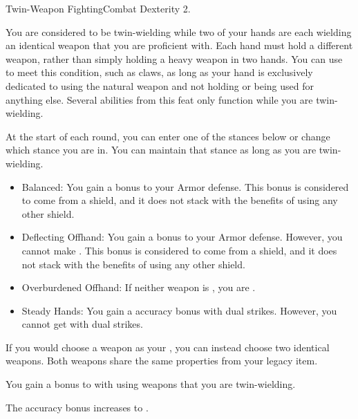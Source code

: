   \begin{feat}{Twin-Weapon Fighting}{Combat}
    \featpre Dexterity 2.

     You are considered to be twin-wielding while two of your hands are each wielding an identical weapon that you are proficient with.
    Each hand must hold a different weapon, rather than simply holding a heavy weapon in two hands.
    You can use  to meet this condition, such as claws, as long as your hand is exclusively dedicated to using the natural weapon and not holding or being used for anything else.
    Several abilities from this feat only function while you are twin-wielding.

     At the start of each round, you can enter one of the stances below or change which stance you are in.
    You can maintain that stance as long as you are twin-wielding.
    \begin{itemize}
      \item Balanced: You gain a  bonus to your Armor defense.
        This bonus is considered to come from a shield, and it does not stack with the benefits of using any other shield.
      \item Deflecting Offhand: You gain a  bonus to your Armor defense.
        However, you cannot make .
        This bonus is considered to come from a shield, and it does not stack with the benefits of using any other shield.
      \item Overburdened Offhand: If neither weapon is , you are \empowered.
      \item Steady Hands: You gain a  accuracy bonus with dual strikes.
        However, you cannot get  with dual strikes.
    \end{itemize}

     If you would choose a weapon as your , you can instead choose two identical weapons.
    Both weapons share the same properties from your legacy item.

     You gain a  bonus to  with  using weapons that you are twin-wielding.

     The accuracy bonus increases to .
  \end{feat}

